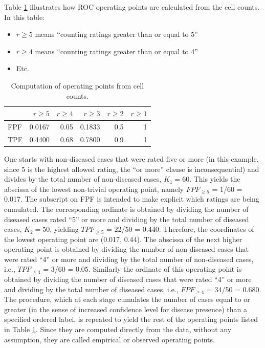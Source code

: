 \documentclass[
]{book}
\providecommand{\tightlist}{%
  \setlength{\itemsep}{0pt}\setlength{\parskip}{0pt}}
\begin{document}
Table \ref{tab:ratings-paradigm-table-2} illustrates how ROC operating points are calculated from the cell counts. In this table:

\begin{itemize}
\tightlist
\item
  \(r\geq 5\) means ``counting ratings greater than or equal to 5''
\item
  \(r\geq 4\) means ``counting ratings greater than or equal to 4''
\item
  Etc.
\end{itemize}

\begin{table}

\caption{\label{tab:ratings-paradigm-table-2}Computation of operating points from cell counts.}
\centering
\begin{tabular}[t]{l|r|r|r|r|r}
\hline
  & $r\geq 5$ & $r\geq 4$ & $r\geq 3$ & $r\geq 2$ & $r\geq 1$\\
\hline
FPF & 0.0167 & 0.05 & 0.1833 & 0.5 & 1\\
\hline
TPF & 0.4400 & 0.68 & 0.7800 & 0.9 & 1\\
\hline
\end{tabular}
\end{table}

One starts with non-diseased cases that were rated five or more (in this example, since 5 is the highest allowed rating, the ``or more'' clause is inconsequential) and divides by the total number of non-diseased cases, \(K_1 = 60\). This yields the abscissa of the lowest non-trivial operating point, namely \(FPF_{\ge5}\) = 1/60 = 0.017. The subscript on FPF is intended to make explicit which ratings are being cumulated. The corresponding ordinate is obtained by dividing the number of diseased cases rated ``5'' or more and dividing by the total number of diseased cases, \(K_2 = 50\), yielding \(TPF_{\ge5}\) = 22/50 = 0.440. Therefore, the coordinates of the lowest operating point are (0.017, 0.44). The abscissa of the next higher operating point is obtained by dividing the number of non-diseased cases that were rated ``4'' or more and dividing by the total number of non-diseased cases, i.e., \(TPF_{\ge4}\) = 3/60 = 0.05. Similarly the ordinate of this operating point is obtained by dividing the number of diseased cases that were rated ``4'' or more and dividing by the total number of diseased cases, i.e., \(FPF_{\ge4}\) = 34/50 = 0.680. The procedure, which at each stage cumulates the number of cases equal to or greater (in the sense of increased confidence level for disease presence) than a specified ordered label, is repeated to yield the rest of the operating points listed in Table \ref{tab:ratings-paradigm-table-2}. Since they are computed directly from the data, without any assumption, they are called empirical or observed operating points.
\end{document}
